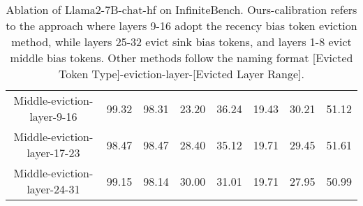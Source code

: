 \begin{table}[H]
{\begin{tabular}{cccccccc}
Middle-eviction-layer-9-16 & 99.32 & 98.31 & 23.20 & 36.24 & 19.43 & 30.21 & 51.12 \\
Middle-eviction-layer-17-23 & 98.47 & 98.47 & 28.40 & 35.12 & 19.71 & 29.45 & 51.61 \\
Middle-eviction-layer-24-31 & 99.15 & 98.14 & 30.00 & 31.01 & 19.71 & 27.95 & 50.99 \\
\bottomrule
\end{tabular}
}
\caption{Ablation of Llama2-7B-chat-hf on InfiniteBench. Ours-calibration refers to the approach where layers 9-16 adopt the recency bias token eviction method, while layers 25-32 evict sink bias tokens, and layers 1-8 evict middle bias tokens. Other methods follow the naming format [Evicted Token Type]-eviction-layer-[Evicted Layer Range].}
\label{tab:InfiniteBench_ablation}
\end{table}
